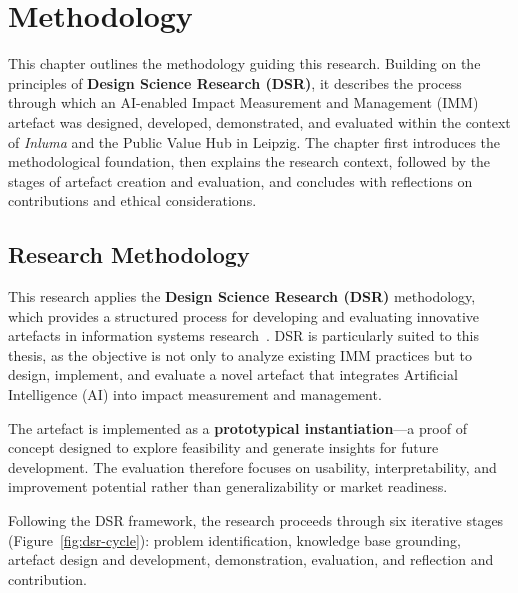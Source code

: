 \chapter{Methodology}\label{ch:methodology}

This chapter outlines the methodology guiding this research.
Building on the principles of \textbf{Design Science Research (DSR)}, it describes the process through which an AI-enabled Impact Measurement and Management (IMM) artefact was designed, developed, demonstrated, and evaluated within the context of \textit{Inluma} and the Public Value Hub in Leipzig.
The chapter first introduces the methodological foundation, then explains the research context, followed by the stages of artefact creation and evaluation, and concludes with reflections on contributions and ethical considerations.

\section{Research Methodology}\label{sec:research-methodology}

This research applies the \textbf{Design Science Research (DSR)} methodology, which provides a structured process for developing and evaluating innovative artefacts in information systems research~\parencite{hevner2004design, peffers2007design}.
DSR is particularly suited to this thesis, as the objective is not only to analyze existing IMM practices but to design, implement, and evaluate a novel artefact that integrates Artificial Intelligence (AI) into impact measurement and management.

The artefact is implemented as a \textbf{prototypical instantiation}—a proof of concept designed to explore feasibility and generate insights for future development.
The evaluation therefore focuses on usability, interpretability, and improvement potential rather than generalizability or market readiness.

Following the DSR framework, the research proceeds through six iterative stages (Figure~\ref{fig:dsr-cycle}): problem identification, knowledge base grounding, artefact design and development, demonstration, evaluation, and reflection and contribution.

